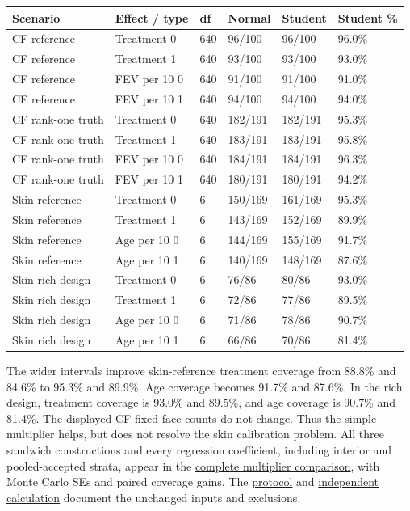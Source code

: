 \documentclass[11pt]{article}
\begin{document}
{
\begin{longtable}{llllll}
\toprule
\textbf{Scenario} & \textbf{Effect / type} & \textbf{df} & \textbf{Normal} & \textbf{Student} & \textbf{Student \%} \\
\midrule
\endhead
\bottomrule
\endlastfoot
CF reference & Treatment 0 & 640 & 96/100 & 96/100 & 96.0\% \\
CF reference & Treatment 1 & 640 & 93/100 & 93/100 & 93.0\% \\
CF reference & FEV per 10 0 & 640 & 91/100 & 91/100 & 91.0\% \\
CF reference & FEV per 10 1 & 640 & 94/100 & 94/100 & 94.0\% \\
CF rank-one truth & Treatment 0 & 640 & 182/191 & 182/191 & 95.3\% \\
CF rank-one truth & Treatment 1 & 640 & 183/191 & 183/191 & 95.8\% \\
CF rank-one truth & FEV per 10 0 & 640 & 184/191 & 184/191 & 96.3\% \\
CF rank-one truth & FEV per 10 1 & 640 & 180/191 & 180/191 & 94.2\% \\
Skin reference & Treatment 0 & 6 & 150/169 & 161/169 & 95.3\% \\
Skin reference & Treatment 1 & 6 & 143/169 & 152/169 & 89.9\% \\
Skin reference & Age per 10 0 & 6 & 144/169 & 155/169 & 91.7\% \\
Skin reference & Age per 10 1 & 6 & 140/169 & 148/169 & 87.6\% \\
Skin rich design & Treatment 0 & 6 & 76/86 & 80/86 & 93.0\% \\
Skin rich design & Treatment 1 & 6 & 72/86 & 77/86 & 89.5\% \\
Skin rich design & Age per 10 0 & 6 & 71/86 & 78/86 & 90.7\% \\
Skin rich design & Age per 10 1 & 6 & 66/86 & 70/86 & 81.4\% \\
\end{longtable}}

The wider intervals improve skin-reference treatment coverage from 88.8\% and 84.6\% to 95.3\% and 89.9\%. Age coverage becomes 91.7\% and 87.6\%. In the rich design, treatment coverage is 93.0\% and 89.5\%, and age coverage is 90.7\% and 81.4\%. The displayed CF fixed-face counts do not change. Thus the simple multiplier helps, but does not resolve the skin calibration problem. All three sandwich constructions and every regression coefficient, including interior and pooled-accepted strata, appear in the \href{../results/manuscript_v011/reference_coverage.csv}{complete multiplier comparison}, with Monte Carlo SEs and paired coverage gains. The \href{../docs/reproducibility.md}{protocol} and \href{../tools/recompute_multiplier.py}{independent calculation} document the unchanged inputs and exclusions.
\end{document}
